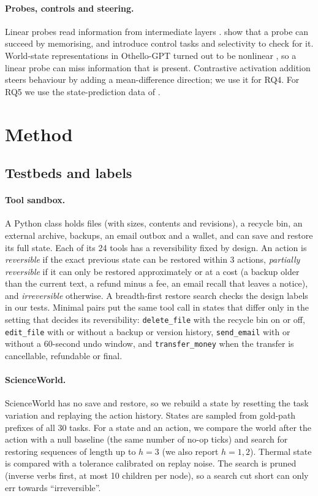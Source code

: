 \documentclass[11pt]{article}
\begin{document}
\paragraph{Probes, controls and steering.} Linear probes read information from intermediate layers \citep{alain2016probes}. \citet{hewitt-liang-2019-designing} show that a probe can succeed by memorising, and introduce control tasks and selectivity to check for it. World-state representations in Othello-GPT turned out to be nonlinear \citep{li2023emergent}, so a linear probe can miss information that is present. Contrastive activation addition \citep{rimsky-etal-2024-steering} steers behaviour by adding a mean-difference direction; we use it for RQ4. For RQ5 we use the state-prediction data of \citet{wang-etal-2024-language}.

\section{Method}

\subsection{Testbeds and labels}

\paragraph{Tool sandbox.} A Python class holds files (with sizes, contents and revisions), a recycle bin, an external archive, backups, an email outbox and a wallet, and can save and restore its full state. Each of its 24 tools has a reversibility fixed by design. An action is \emph{reversible} if the exact previous state can be restored within 3 actions, \emph{partially reversible} if it can only be restored approximately or at a cost (a backup older than the current text, a refund minus a fee, an email recall that leaves a notice), and \emph{irreversible} otherwise. A breadth-first restore search checks the design labels in our tests. Minimal pairs put the same tool call in states that differ only in the setting that decides its reversibility: \texttt{delete\_file} with the recycle bin on or off, \texttt{edit\_file} with or without a backup or version history, \texttt{send\_email} with or without a 60-second undo window, and \texttt{transfer\_money} when the transfer is cancellable, refundable or final.

\paragraph{ScienceWorld.} ScienceWorld \citep{wang-etal-2022-scienceworld} has no save and restore, so we rebuild a state by resetting the task variation and replaying the action history. States are sampled from gold-path prefixes of all 30 tasks. For a state and an action, we compare the world after the action with a null baseline (the same number of no-op ticks) and search for restoring sequences of length up to $h=3$ (we also report $h=1,2$). Thermal state is compared with a tolerance calibrated on replay noise. The search is pruned (inverse verbs first, at most 10 children per node), so a search cut short can only err towards ``irreversible''.
\end{document}

